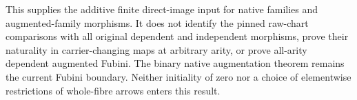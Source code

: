 \documentclass{article}
\begin{document}
This supplies the additive finite direct-image input for native
families and augmented-family morphisms. It does not identify the
pinned raw-chart comparisons with all original dependent and
independent morphisms, prove their naturality in carrier-changing
maps at arbitrary arity, or prove all-arity dependent augmented
Fubini. The binary native augmentation theorem remains the current
Fubini boundary. Neither initiality of zero nor a choice of
elementwise restrictions of whole-fibre arrows enters this result.
\end{document}
